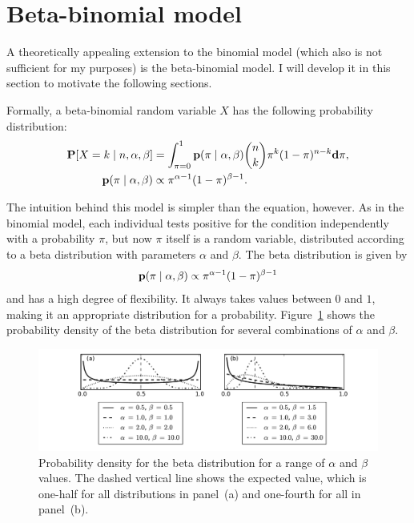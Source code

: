 \section{Beta-binomial model}
\label{beta-binomial-model}
A theoretically appealing extension to the binomial model (which also
is not sufficient for my purposes) is the beta-binomial model.  I will
develop it in this section to motivate the following sections.

Formally, a beta-binomial random variable $X$ has the following
probability distribution:
\begin{align*}
\mathbf{P}[X = k\;|\; n, \alpha, \beta]  &= \int_{\pi=0}^1 \mathbf{p}(\pi\;|\; \alpha, \beta) \binom{n}{k}\pi^k(1-\pi)^{n-k} \mathbf{d}\pi,\\
\mathbf{p}(\pi\;|\; \alpha, \beta) &\propto \pi^{\alpha-1}(1-\pi)^{\beta-1}.
\end{align*}

The intuition behind this model is simpler than the equation,
however. As in the binomial model, each individual tests positive for
the condition independently with a probability $\pi$, but now $\pi$
itself is a random variable, distributed according to a beta
distribution with parameters $\alpha$ and $\beta$. The beta
distribution is given by
\[
\mathbf{p}(\pi\;|\; \alpha, \beta)
\propto \pi^{\alpha-1}(1-\pi)^{\beta-1}
\]
and has a high degree of flexibility.  It always takes values
between $0$ and $1$, making it an appropriate distribution for a
probability.  Figure~\ref{rate-model-beta} shows the probability
density of the beta distribution for several combinations of $\alpha$
and $\beta$.
\begin{figure}[ht]
\begin{center}
\includegraphics[width=\textwidth]{beta-distribution.pdf}
\end{center}
\caption{Probability density for the beta distribution for a range of
  $\alpha$ and $\beta$ values. The dashed vertical line shows the expected value,
  which is one-half for all distributions in panel~(a) and
  one-fourth for all in panel~(b).}
\label{rate-model-beta}
\end{figure}

